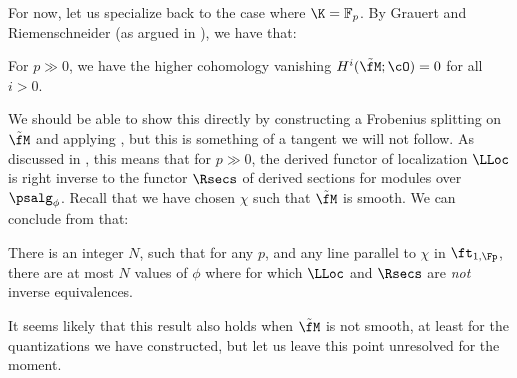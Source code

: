 For now, let us specialize back to the case where $\K=\mathbb{F}_p$.  By  Grauert and Riemenschneider (as argued in \cite[Lemma 2.1]{Kal00}), we have that:
\begin{corollary}\label{cor:cohomology-vanishing}
For $p\gg 0$, we have the higher cohomology vanishing $H^i(\tilde{\fM};\cO)=0$ for all $i>0$.
\end{corollary}
We should be able to show this directly by constructing a Frobenius
splitting on $\tilde{\fM}$ and applying \cite{MR1156382}, but this is
something of a tangent we will not follow.
As discussed in \cite{KalDEQ}, this means that for $p\gg 0$, the
derived functor of localization $\LLoc$ is right inverse to the
functor  $\Rsecs$ of derived sections for modules over $\psalg_\phi$.  
Recall that we have chosen $\chi$ such that  $\tilde{\fM}$ is smooth. We can conclude from \cite[Thm. 4.2]{KalDEQ} that:

\begin{lemma}\label{lem:upper-bound}
  There is an integer $N$, such that for any $p$, and any line parallel to $\chi$ in $\ft_{1,\Fp}$, there are at most $N$ values of $\phi$ where for which $\LLoc$ and $\Rsecs$ are {\em not} inverse equivalences.  
\end{lemma}
\begin{remark}
It seems likely that this result also holds when $\tilde{\fM}$ is not smooth, at least for the quantizations we have constructed, but let us leave this point unresolved for the moment.
\end{remark}

